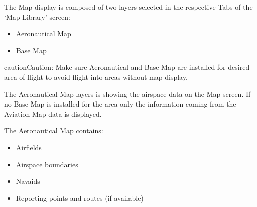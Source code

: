 \documentclass[letterpaper,10pt,english]{sphinxmanual}
\begin{document}
\sphinxAtStartPar
The Map display is composed of two layers selected in the respective Tabs of the
‘Map Library’ screen:
\begin{itemize}
\item {} 
\sphinxAtStartPar
Aeronautical Map

\item {} 
\sphinxAtStartPar
Base Map

\end{itemize}

\begin{sphinxadmonition}{caution}{Caution:}
\sphinxAtStartPar
Make sure Aeronautical and Base Map are installed for desired area
of flight to avoid flight into areas without map display.
\end{sphinxadmonition}

\sphinxAtStartPar
{}

\sphinxAtStartPar
The Aeronautical Map layers is showing the airspace data on the Map screen. If no Base Map is installed for the area only the information coming from the Aviation Map data is displayed.

\sphinxAtStartPar
The Aeronautical Map contains:
\begin{itemize}
\item {} 
\sphinxAtStartPar
Airfields

\item {} 
\sphinxAtStartPar
Airspace boundaries

\item {} 
\sphinxAtStartPar
Navaids

\item {} 
\sphinxAtStartPar
Reporting points and routes (if available)

\end{itemize}
\end{document}
